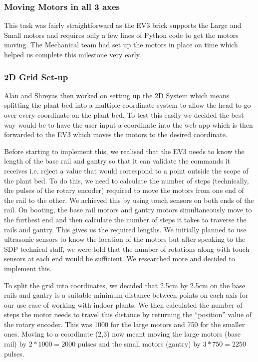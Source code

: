 \documentclass{article}
\begin{document}
\subsubsection{Moving Motors in all 3 axes}

This task was fairly straightforward as the EV3 brick supports the Large and Small motors and requires only a few lines of Python code to get the motors moving. The Mechanical team had set up the motors in place on time which helped us complete this milestone very early.

\subsubsection{2D Grid Set-up}
Alan and Shreyas then worked on setting up the 2D System which means splitting the plant bed into a multiple-coordinate system to allow the head to go over every coordinate on the plant bed. To test this easily we decided the best way would be to have the user input a coordinate into the web app which is then forwarded to the EV3 which moves the motors to the desired coordinate.

Before starting to implement this, we realised that the EV3 needs to know the length of the base rail and gantry so that it can validate the commands it receives i.e. reject a value that would correspond to a point outside the scope of the plant bed. To do this, we need to calculate the number of steps (technically, the pulses of the rotary encoder) required to move the motors from one end of the rail to the other. We achieved this by using touch sensors on both ends of the rail. On booting, the base rail motors and gantry motors simultaneously move to the furthest end and then calculate the number of steps it takes to traverse the rails and gantry. This gives us the required lengths. 
We initially planned to use ultrasonic sensors to know the location of the motors but after speaking to the SDP technical staff, we were told that the number of rotations along with touch sensors at each end would be sufficient. We researched more and decided to implement this. 

To split the grid into coordinates, we decided that 2.5cm by 2.5cm on the base rails and gantry is a suitable minimum distance between points on each axis for our use case of working with indoor plants. We then calculated the number of steps the motor needs to travel this distance by returning the “position” value of the rotary encoder. This was 1000 for the large motors and 750 for the smaller ones. Moving to a coordinate (2,3) now meant moving the large motors (base rail) by $2*1000 = 2000$ pulses and the small motors (gantry) by $3*750 = 2250$ pulses.
\end{document}
